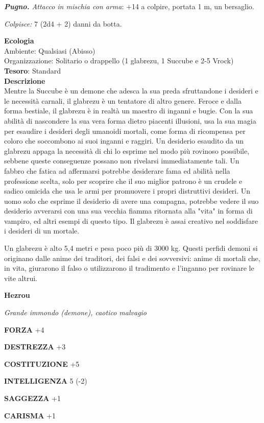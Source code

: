 \begin{multicols}{2}
\textit{\textbf{Pugno.} Attacco in mischia con arma}: +14 a colpire, portata 1 m, un bersaglio.

\textit{Colpisce:} 7 (2d4 + 2) danni da botta.

\textbf{Ecologia}\\
Ambiente: Qualsiasi (Abisso)\\
Organizzazione: Solitario o drappello (1 glabrezu, 1 Succube e 2-5 Vrock)
\textbf{Tesoro}: Standard\\
\textbf{Descrizione}\\
Mentre la Succube è un demone che adesca la sua preda sfruttandone i desideri e le necessità carnali, il glabrezu è un tentatore di altro genere. Feroce e dalla forma bestiale, il glabrezu è in realtà un maestro di inganni e bugie. Con la sua abilità di nascondere la sua vera forma dietro piacenti illusioni, usa la sua magia per esaudire i desideri degli umanoidi mortali, come forma di ricompensa per coloro che soccombono ai suoi inganni e raggiri. Un desiderio esaudito da un glabrezu appaga la necessità di chi lo esprime nel modo più rovinoso possibile, sebbene queste conseguenze possano non rivelarsi immediatamente tali. Un fabbro che fatica ad affermarsi potrebbe desiderare fama ed abilità nella professione scelta, solo per scoprire che il suo miglior patrono è un crudele e sadico omicida che usa le armi per promuovere i propri distruttivi desideri. Un uomo solo che esprime il desiderio di avere una compagna, potrebbe vedere il suo desiderio avverarsi con una sua vecchia fiamma ritornata alla "vita" in forma di vampiro, ed altri esempi di questo tipo. Il glabrezu è assai creativo nel soddisfare i desideri di un mortale.

Un glabrezu è alto 5,4 metri e pesa poco più di 3000 kg. Questi perfidi demoni si originano dalle anime dei traditori, dei falsi e dei sovversivi: anime di mortali che, in vita, giurarono il falso o utilizzarono il tradimento e l'inganno per rovinare le vite altrui.

\medskip{}\textbf{Hezrou}

\textit{Grande immondo (demone), caotico malvagio}

\textbf{FORZA} +4

\textbf{DESTREZZA} +3

\textbf{COSTITUZIONE} +5

\textbf{INTELLIGENZA} 5 (-2)

\textbf{SAGGEZZA} +1

\textbf{CARISMA} +1


\end{multicols}
